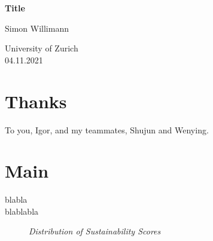 \documentclass{article}
\begin{document}
\begin{titlepage}
	\centering
	{\huge\bfseries Title \par}
	\vspace{2cm}
	Simon Willimann

	\vfill
	\begin{flushleft}
	University of Zurich\\
	04.11.2021
	\end{flushleft}




\end{titlepage}



\begin{abstract}
abstract yada yada

\end{abstract}
\newpage

\section*{Thanks}
To you, Igor, and my teammates, Shujun and Wenying.

\section{Main}
\Blindtext[7]
blabla\cite{Gormsen2020} \\
blablabla\cite{Kozlowski2020}


\begin{figure}
		\centering
  		\caption{}
        \emph{Distribution of Sustainability Scores}
\end{figure}
\end{document}
